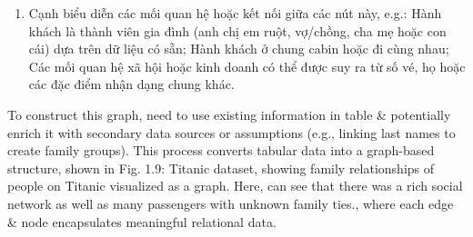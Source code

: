 \documentclass{article}
\begin{document}
\begin{itemize}
\begin{itemize}
\begin{itemize}
\begin{itemize}
\begin{enumerate}
                    \item Cạnh biểu diễn các mối quan hệ hoặc kết nối giữa các nút này, e.g.: Hành khách là thành viên gia đình (anh chị em ruột, vợ/chồng, cha mẹ hoặc con cái) dựa trên dữ liệu có sẵn; Hành khách ở chung cabin hoặc đi cùng nhau; Các mối quan hệ xã hội hoặc kinh doanh có thể được suy ra từ số vé, họ hoặc các đặc điểm nhận dạng chung khác.
                \end{enumerate}
                To construct this graph, need to use existing information in table \& potentially enrich it with secondary data sources or assumptions (e.g., linking last names to create family groups). This process converts tabular data into a graph-based structure, shown in {\sf Fig. 1.9: Titanic dataset, showing family relationships of people on Titanic visualized as a graph. Here, can see that there was a rich social network as well as many passengers with unknown family ties.}, where each edge \& node encapsulates meaningful relational data.


\end{itemize}
\end{itemize}
\end{itemize}
\end{itemize}
\end{document}

